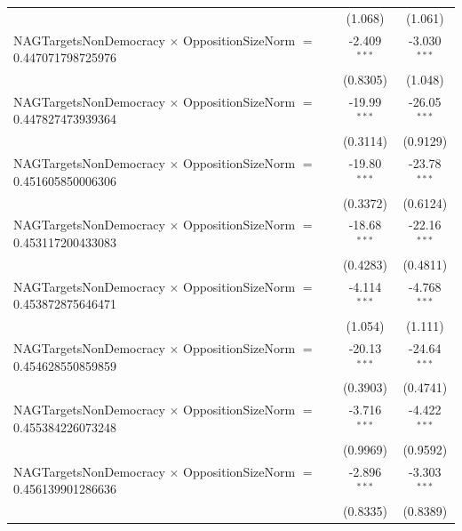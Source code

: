 \begin{tabular}{lcc}
                                                                                & (1.068)              & (1.061)\\   
   NAGTargetsNonDemocracy $\times$ OppositionSizeNorm $=$ 0.447071798725976     & -2.409$^{***}$       & -3.030$^{***}$\\   
                                                                                & (0.8305)             & (1.048)\\   
   NAGTargetsNonDemocracy $\times$ OppositionSizeNorm $=$ 0.447827473939364     & -19.99$^{***}$       & -26.05$^{***}$\\   
                                                                                & (0.3114)             & (0.9129)\\   
   NAGTargetsNonDemocracy $\times$ OppositionSizeNorm $=$ 0.451605850006306     & -19.80$^{***}$       & -23.78$^{***}$\\   
                                                                                & (0.3372)             & (0.6124)\\   
   NAGTargetsNonDemocracy $\times$ OppositionSizeNorm $=$ 0.453117200433083     & -18.68$^{***}$       & -22.16$^{***}$\\   
                                                                                & (0.4283)             & (0.4811)\\   
   NAGTargetsNonDemocracy $\times$ OppositionSizeNorm $=$ 0.453872875646471     & -4.114$^{***}$       & -4.768$^{***}$\\   
                                                                                & (1.054)              & (1.111)\\   
   NAGTargetsNonDemocracy $\times$ OppositionSizeNorm $=$ 0.454628550859859     & -20.13$^{***}$       & -24.64$^{***}$\\   
                                                                                & (0.3903)             & (0.4741)\\   
   NAGTargetsNonDemocracy $\times$ OppositionSizeNorm $=$ 0.455384226073248     & -3.716$^{***}$       & -4.422$^{***}$\\   
                                                                                & (0.9969)             & (0.9592)\\   
   NAGTargetsNonDemocracy $\times$ OppositionSizeNorm $=$ 0.456139901286636     & -2.896$^{***}$       & -3.303$^{***}$\\   
                                                                                & (0.8335)             & (0.8389)\\   

\end{tabular}
